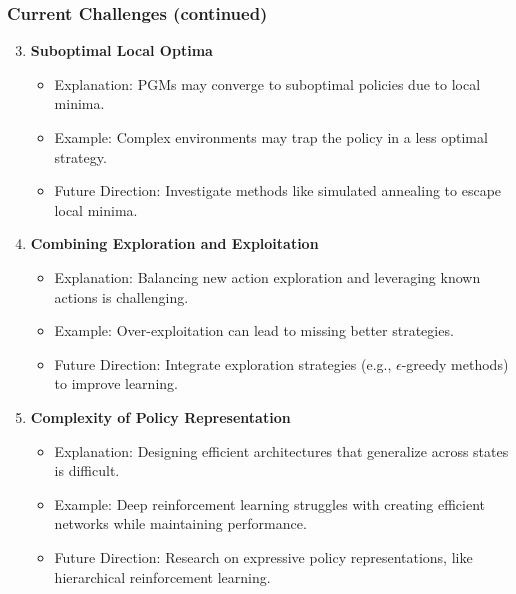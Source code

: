 \documentclass[aspectratio=169]{beamer}
\begin{document}
\begin{frame}[fragile]
    \frametitle{Current Challenges (continued)}
    \begin{enumerate}
        \setcounter{enumi}{2} %
        \item \textbf{Suboptimal Local Optima}
            \begin{itemize}
                \item Explanation: PGMs may converge to suboptimal policies due to local minima.
                \item Example: Complex environments may trap the policy in a less optimal strategy.
                \item Future Direction: Investigate methods like simulated annealing to escape local minima.
            \end{itemize}
        \item \textbf{Combining Exploration and Exploitation}
            \begin{itemize}
                \item Explanation: Balancing new action exploration and leveraging known actions is challenging.
                \item Example: Over-exploitation can lead to missing better strategies.
                \item Future Direction: Integrate exploration strategies (e.g., $\epsilon$-greedy methods) to improve learning.
            \end{itemize}
        \item \textbf{Complexity of Policy Representation}
            \begin{itemize}
                \item Explanation: Designing efficient architectures that generalize across states is difficult.
                \item Example: Deep reinforcement learning struggles with creating efficient networks while maintaining performance.
                \item Future Direction: Research on expressive policy representations, like hierarchical reinforcement learning.
            \end{itemize}
    \end{enumerate}
\end{frame}
\end{document}
